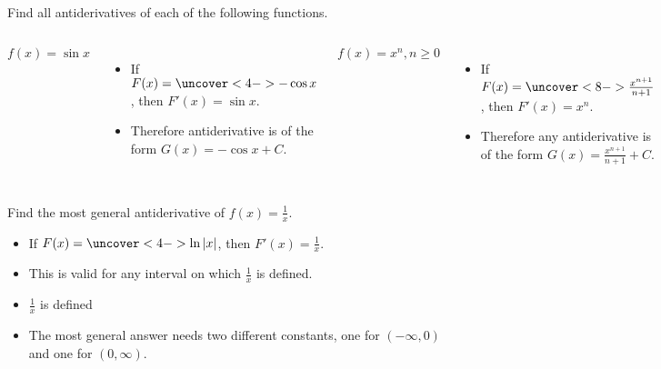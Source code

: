 \begin{frame}
\begin{example}
Find all antiderivatives of each of the following functions.
\begin{columns}[c]
\[
f(x) = \sin x%
\]
\begin{itemize}
\item<2->  If \alert<handout:0| 3-4>{$F(x) = \uncover<4->{-\cos x}$}, then $F'(x) = \sin x$.
\item<5->  Therefore antiderivative is of the form $G(x) = -\cos x + C$.
\end{itemize}
\[
f(x) = x^n, n\geq 0%
\]
\begin{itemize}
\item<6->  If \alert<handout:0| 7-8>{$F(x) = \uncover<8->{\frac{x^{n+1}}{n+1}}$}, then $F'(x) = x^n$.
\item<9->  Therefore any antiderivative is of the form $G(x) = \frac{x^{n+1}}{n+1} + C$.
\end{itemize}
\end{columns}
\end{example}
\end{frame}


\begin{frame}
\begin{example}
Find the most general antiderivative of $\displaystyle f(x) = \frac{1}{x}$.%
\begin{itemize}
\item<2-> If \alert<handout:0| 3-4>{$F(x) = \uncover<4->{\ln |x|}$}, then $\displaystyle F'(x) = \frac{1}{x}$.
\item<5->  This is valid for any interval on which $\displaystyle \frac{1}{x}$ is defined.
\item<6-| alert@6-7>  $\displaystyle \frac{1}{x}$ is defined 
\item<8->  The most general answer needs two different constants, one for $(-\infty , 0)$ and one for $(0, \infty )$.
\end{itemize}
%
\end{example}
\end{frame}

